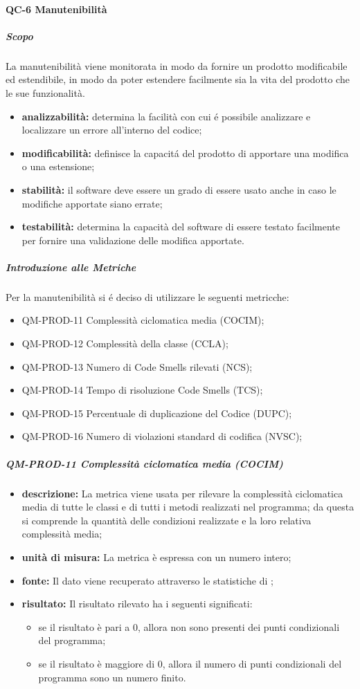 		\paragraph{QC-6 Manutenibilità}
			\subparagraph{Scopo}
				La manutenibilità viene monitorata in modo da fornire un prodotto modificabile ed estendibile, in modo da poter estendere facilmente sia la vita del prodotto che le sue funzionalità.
				\begin{itemize}
					\item \textbf{analizzabilità:} determina la facilità con cui é possibile analizzare e localizzare un errore all'interno del codice;
					\item \textbf{modificabilità:} definisce la capacitá del prodotto di apportare una modifica o una estensione;
					\item \textbf{stabilità:} il software deve essere un grado di essere usato anche in caso le modifiche apportate siano errate;
					\item \textbf{testabilità:} determina la capacità del software di essere testato facilmente per fornire una validazione delle modifica apportate.
				\end{itemize}
			\subparagraph{Introduzione alle Metriche}
				Per la manutenibilità si é deciso di utilizzare le seguenti metricche:
				\begin{itemize}
					\item QM-PROD-11 Complessità ciclomatica media (COCIM);
					\item QM-PROD-12 Complessità della classe (CCLA);
					\item QM-PROD-13 Numero di Code Smells rilevati (NCS);
					\item QM-PROD-14 Tempo di risoluzione Code Smells (TCS);
					\item QM-PROD-15 Percentuale di duplicazione del Codice (DUPC);
					\item QM-PROD-16 Numero di violazioni standard di codifica (NVSC);
				\end{itemize}
			\subparagraph{QM-PROD-11 Complessità ciclomatica media (COCIM)}
			\begin{itemize}
      			\item \textbf{descrizione: }
					La metrica viene usata per rilevare la complessità ciclomatica media di tutte le classi e di tutti i metodi realizzati nel programma; da questa si comprende la quantità delle condizioni realizzate e la loro relativa complessità media;
				\item \textbf{unità di misura: }
					La metrica è espressa con un numero intero;
				\item \textbf{fonte: }
					Il dato viene recuperato attraverso le statistiche di ;
				\item \textbf{risultato: }
					Il risultato rilevato ha i seguenti significati:
					\begin{itemize}
						\item se il risultato è pari a 0, allora non sono presenti dei punti condizionali del programma;
						\item se il risultato è maggiore di 0, allora il numero di punti condizionali del programma sono un numero finito.
					\end{itemize}
			\end{itemize}
